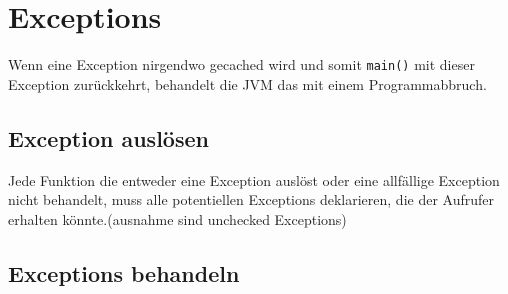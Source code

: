 \section*{Exceptions}
Wenn eine Exception nirgendwo gecached wird und somit \texttt{main()} mit dieser Exception zurückkehrt, behandelt die JVM das mit einem Programmabbruch.
	\subsection*{Exception auslösen}
		Jede Funktion die entweder eine Exception auslöst oder eine allfällige Exception nicht behandelt, muss alle potentiellen Exceptions deklarieren, die der Aufrufer erhalten könnte.(ausnahme sind unchecked Exceptions)
		
	\subsection*{Exceptions behandeln}
		

